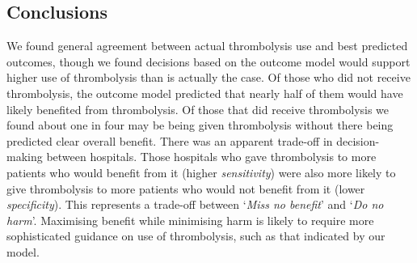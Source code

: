 \subsection{Conclusions}

We found general agreement between actual thrombolysis use and best predicted outcomes, though we found decisions based on the outcome model would support higher use of thrombolysis than is actually the case. Of those who did not receive thrombolysis, the outcome model predicted that nearly half of them would have likely benefited from thrombolysis. Of those that did receive thrombolysis we found about one in four may be being given thrombolysis without there being predicted clear overall benefit. There was an apparent trade-off in decision-making between hospitals. Those hospitals who gave thrombolysis to more patients who would benefit from it (higher \textit{sensitivity}) were also more likely to give thrombolysis to more patients who would not benefit from it (lower \textit{specificity}). This represents a trade-off between `\textit{Miss no benefit}' and `\textit{Do no harm}'. Maximising benefit while minimising harm is likely to require more sophisticated guidance on use of thrombolysis, such as that indicated by our model.
